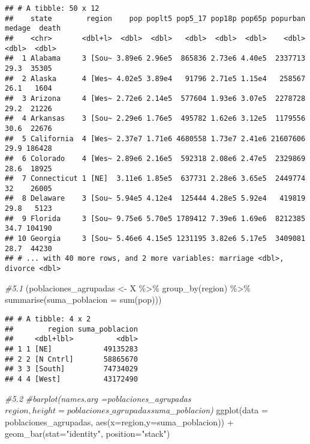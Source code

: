 \documentclass[
]{article}
\newenvironment{Shaded}{\begin{snugshade}}{\end{snugshade}}
\newcommand{\AttributeTok}[1]{\textcolor[rgb]{0.77,0.63,0.00}{#1}}
\newcommand{\CommentTok}[1]{\textcolor[rgb]{0.56,0.35,0.01}{\textit{#1}}}
\newcommand{\FunctionTok}[1]{\textcolor[rgb]{0.00,0.00,0.00}{#1}}
\newcommand{\NormalTok}[1]{#1}
\newcommand{\OtherTok}[1]{\textcolor[rgb]{0.56,0.35,0.01}{#1}}
\newcommand{\SpecialCharTok}[1]{\textcolor[rgb]{0.00,0.00,0.00}{#1}}
\newcommand{\StringTok}[1]{\textcolor[rgb]{0.31,0.60,0.02}{#1}}
\begin{document}
\begin{verbatim}
## # A tibble: 50 x 12
##    state        region    pop poplt5 pop5_17 pop18p pop65p popurban medage  death
##    <chr>       <dbl+l>  <dbl>  <dbl>   <dbl>  <dbl>  <dbl>    <dbl>  <dbl>  <dbl>
##  1 Alabama     3 [Sou~ 3.89e6 2.96e5  865836 2.73e6 4.40e5  2337713   29.3  35305
##  2 Alaska      4 [Wes~ 4.02e5 3.89e4   91796 2.71e5 1.15e4   258567   26.1   1604
##  3 Arizona     4 [Wes~ 2.72e6 2.14e5  577604 1.93e6 3.07e5  2278728   29.2  21226
##  4 Arkansas    3 [Sou~ 2.29e6 1.76e5  495782 1.62e6 3.12e5  1179556   30.6  22676
##  5 California  4 [Wes~ 2.37e7 1.71e6 4680558 1.73e7 2.41e6 21607606   29.9 186428
##  6 Colorado    4 [Wes~ 2.89e6 2.16e5  592318 2.08e6 2.47e5  2329869   28.6  18925
##  7 Connecticut 1 [NE]  3.11e6 1.85e5  637731 2.28e6 3.65e5  2449774   32    26005
##  8 Delaware    3 [Sou~ 5.94e5 4.12e4  125444 4.28e5 5.92e4   419819   29.8   5123
##  9 Florida     3 [Sou~ 9.75e6 5.70e5 1789412 7.39e6 1.69e6  8212385   34.7 104190
## 10 Georgia     3 [Sou~ 5.46e6 4.15e5 1231195 3.82e6 5.17e5  3409081   28.7  44230
## # ... with 40 more rows, and 2 more variables: marriage <dbl>, divorce <dbl>
\end{verbatim}

\begin{Shaded}
\begin{Highlighting}[]
\CommentTok{\#5.1}
\NormalTok{(poblaciones\_agrupadas }\OtherTok{\textless{}{-}}\NormalTok{ X }\SpecialCharTok{\%\textgreater{}\%} \FunctionTok{group\_by}\NormalTok{(region) }\SpecialCharTok{\%\textgreater{}\%} \FunctionTok{summarise}\NormalTok{(}\AttributeTok{suma\_poblacion =} \FunctionTok{sum}\NormalTok{(pop)))}
\end{Highlighting}
\end{Shaded}

\begin{verbatim}
## # A tibble: 4 x 2
##        region suma_poblacion
##     <dbl+lbl>          <dbl>
## 1 1 [NE]            49135283
## 2 2 [N Cntrl]       58865670
## 3 3 [South]         74734029
## 4 4 [West]          43172490
\end{verbatim}

\begin{Shaded}
\begin{Highlighting}[]
\CommentTok{\#5.2}
\CommentTok{\#barplot(names.arg =poblaciones\_agrupadas$region,height=poblaciones\_agrupadas$suma\_poblacion)}
\FunctionTok{ggplot}\NormalTok{(}\AttributeTok{data =}\NormalTok{ poblaciones\_agrupadas, }\FunctionTok{aes}\NormalTok{(}\AttributeTok{x=}\NormalTok{region,}\AttributeTok{y=}\NormalTok{suma\_poblacion)) }\SpecialCharTok{+}
  \FunctionTok{geom\_bar}\NormalTok{(}\AttributeTok{stat=}\StringTok{"identity"}\NormalTok{, }\AttributeTok{position=}\StringTok{"stack"}\NormalTok{)}
\end{Highlighting}
\end{Shaded}
\end{document}

